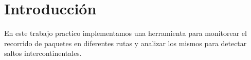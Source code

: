 \section{Introducción}
En este trabajo practico implementamos una herramienta para monitorear el recorrido de paquetes en diferentes rutas y analizar los mismos para detectar saltos intercontinentales.

